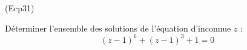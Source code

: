 \begin{tiny}(Ecp31)\end{tiny} 
Déterminer l'ensemble des solutions de l'équation d'inconnue $z$ :
\begin{displaymath}
 (z-1)^6+(z-1)^3+1 = 0
\end{displaymath}
